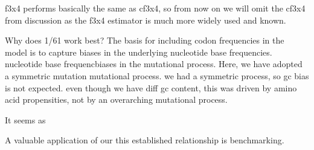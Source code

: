 \documentclass[11pt]{article}
\begin{document}
f3x4 performs basically the same as cf3x4, so from now on we will omit the cf3x4 from discussion as the f3x4 estimator is much more widely used and known.

Why does 1/61 work best? The basis for including codon frequencies in the model is to capture biases in the underlying nucleotide base frequencies.
nucleotide base frequencbiases in the mutational process. Here, we have adopted a symmetric mutation
mutational process. we had a symmetric process, so gc bias is not expected. even though we have diff gc content, this was driven by amino acid propensities, not by an overarching mutational process. 


It seems as 


A valuable application of our this established relationship is benchmarking.


\end{document}
